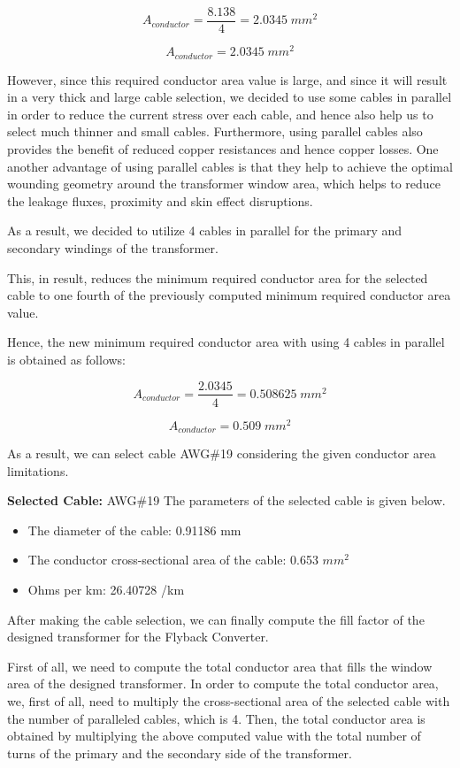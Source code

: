$$ A_{conductor} = \frac{8.138}{4} = 2.0345\;mm^2 $$

$$ A_{conductor} = 2.0345\;mm^2 $$

However, since this required conductor area value is large, and since it will result in a very thick and large cable selection, we decided to use some cables in parallel in order to reduce the current stress over each cable, and hence also help us to select much thinner and small cables. Furthermore, using parallel cables also provides the benefit of reduced copper resistances and hence copper losses. One another advantage of using parallel cables is that they help to achieve the optimal wounding geometry around the transformer window area, which helps to reduce the leakage fluxes, proximity and skin effect disruptions.

As a result, we decided to utilize 4 cables in parallel for the primary and secondary windings of the transformer.

This, in result, reduces the minimum required conductor area for the selected cable to one fourth of the previously computed minimum required conductor area value.

Hence, the new minimum required conductor area with using 4 cables in parallel is obtained as follows:

$$ A_{conductor} = \frac{2.0345}{4} = 0.508625\;mm^2 $$

$$ A_{conductor} = 0.509\;mm^2 $$

As a result, we can select cable AWG\#19 considering the given conductor area limitations.

\textbf{Selected Cable: }AWG\#19
The parameters of the selected cable is given below.

\begin{itemize}
    \item The diameter of the cable: 0.91186 mm
    \item The conductor cross-sectional area of the cable: 0.653 $mm^2$
    \item Ohms per km: 26.40728 \ohm/km
\end{itemize}

After making the cable selection, we can finally compute the fill factor of the designed transformer for the Flyback Converter.

First of all, we need to compute the total conductor area that fills the window area of the designed transformer. In order to compute the total conductor area, we, first of all, need to multiply the cross-sectional area of the selected cable with the number of paralleled cables, which is 4. Then, the total conductor area is obtained by multiplying the above computed value with the total number of turns of the primary and the secondary side of the transformer.

